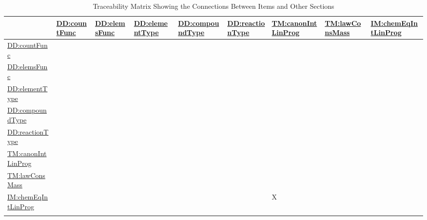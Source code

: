 \documentclass[12pt]{article}
\begin{document}
\begin{longtable}{l l l l l l l l l}
\toprule
\textbf{} & \textbf{\hyperref[DD:countFunc]{DD:countFunc}} & \textbf{\hyperref[DD:elemsFunc]{DD:elemsFunc}} & \textbf{\hyperref[DD:elementType]{DD:elementType}} & \textbf{\hyperref[DD:compoundType]{DD:compoundType}} & \textbf{\hyperref[DD:reactionType]{DD:reactionType}} & \textbf{\hyperref[TM:canonIntLinProg]{TM:canonIntLinProg}} & \textbf{\hyperref[TM:lawConsMass]{TM:lawConsMass}} & \textbf{\hyperref[IM:chemEqIntLinProg]{IM:chemEqIntLinProg}}
\\
\midrule
\endhead
\hyperref[DD:countFunc]{DD:countFunc} &  &  &  &  &  &  &  & 
\\
\hyperref[DD:elemsFunc]{DD:elemsFunc} &  &  &  &  &  &  &  & 
\\
\hyperref[DD:elementType]{DD:elementType} &  &  &  &  &  &  &  & 
\\
\hyperref[DD:compoundType]{DD:compoundType} &  &  &  &  &  &  &  & 
\\
\hyperref[DD:reactionType]{DD:reactionType} &  &  &  &  &  &  &  & 
\\
\hyperref[TM:canonIntLinProg]{TM:canonIntLinProg} &  &  &  &  &  &  &  & 
\\
\hyperref[TM:lawConsMass]{TM:lawConsMass} &  &  &  &  &  &  &  & 
\\
\hyperref[IM:chemEqIntLinProg]{IM:chemEqIntLinProg} &  &  &  &  &  & X &  & 
\\
\bottomrule
\caption{Traceability Matrix Showing the Connections Between Items and Other Sections}
\label{Table:TraceMatRefvsRef}
\end{longtable}
\end{document}
